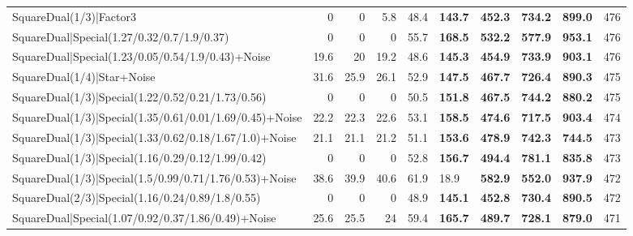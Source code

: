 \begin{tabular}{lrrrrllllr}
 SquareDual(1/3)|Factor3                                 &          0   &          0   &          5.8 &            48.4 & \textbf{143.7} & \textbf{452.3} & \textbf{734.2} & \textbf{899.0}  &          476 \\
 SquareDual|Special(1.27/0.32/0.7/1.9/0.37)              &          0   &          0   &          0   &            55.7 & \textbf{168.5} & \textbf{532.2} & \textbf{577.9} & \textbf{953.1}  &          476 \\
 SquareDual|Special(1.23/0.05/0.54/1.9/0.43)+Noise       &         19.6 &         20   &         19.2 &            48.6 & \textbf{145.3} & \textbf{454.9} & \textbf{733.9} & \textbf{903.1}  &          476 \\
 SquareDual(1/4)|Star+Noise                              &         31.6 &         25.9 &         26.1 &            52.9 & \textbf{147.5} & \textbf{467.7} & \textbf{726.4} & \textbf{890.3}  &          475 \\
 SquareDual(1/3)|Special(1.22/0.52/0.21/1.73/0.56)       &          0   &          0   &          0   &            50.5 & \textbf{151.8} & \textbf{467.5} & \textbf{744.2} & \textbf{880.2}  &          475 \\
 SquareDual(1/3)|Special(1.35/0.61/0.01/1.69/0.45)+Noise &         22.2 &         22.3 &         22.6 &            53.1 & \textbf{158.5} & \textbf{474.6} & \textbf{717.5} & \textbf{903.4}  &          474 \\
 SquareDual(1/3)|Special(1.33/0.62/0.18/1.67/1.0)+Noise  &         21.1 &         21.1 &         21.2 &            51.1 & \textbf{153.6} & \textbf{478.9} & \textbf{742.3} & \textbf{744.5}  &          473 \\
 SquareDual(1/3)|Special(1.16/0.29/0.12/1.99/0.42)       &          0   &          0   &          0   &            52.8 & \textbf{156.7} & \textbf{494.4} & \textbf{781.1} & \textbf{835.8}  &          473 \\
 SquareDual(1/3)|Special(1.5/0.99/0.71/1.76/0.53)+Noise  &         38.6 &         39.9 &         40.6 &            61.9 & 18.9           & \textbf{582.9} & \textbf{552.0} & \textbf{937.9}  &          472 \\
 SquareDual(2/3)|Special(1.16/0.24/0.89/1.8/0.55)        &          0   &          0   &          0   &            48.9 & \textbf{145.1} & \textbf{452.8} & \textbf{730.4} & \textbf{890.5}  &          472 \\
 SquareDual|Special(1.07/0.92/0.37/1.86/0.49)+Noise      &         25.6 &         25.5 &         24   &            59.4 & \textbf{165.7} & \textbf{489.7} & \textbf{728.1} & \textbf{879.0}  &          471 \\

\end{tabular}
